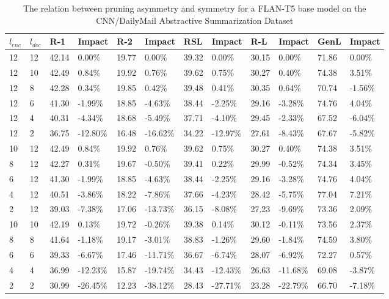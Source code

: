 \begin{table*}[!ht]
    \centering
    \caption{The relation between pruning asymmetry and symmetry for a FLAN-T5 base model on the CNN/DailyMail Abstractive Summarization Dataset}
    \small
    \begin{tabular}{|l|l|l|l|l|l|l|l|l|l|l|l|}
    \hline
        $l_{enc}$ & $l_{dec}$ & R-1 & Impact & R-2 & Impact & RSL & Impact & R-L & Impact & GenL & Impact \\ \hline
        12 & 12 & 42.14 & 0.00\% & 19.77 & 0.00\% & 39.32 & 0.00\% & 30.15 & 0.00\% & 71.86 & 0.00\% \\ \hline
        12 & 10 & 42.49 & 0.84\% & 19.92 & 0.76\% & 39.62 & 0.75\% & 30.27 & 0.40\% & 74.38 & 3.51\% \\ \hline
        12 & 8 & 42.28 & 0.34\% & 19.85 & 0.42\% & 39.48 & 0.41\% & 30.35 & 0.64\% & 70.74 & -1.56\% \\ \hline
        12 & 6 & 41.30 & -1.99\% & 18.85 & -4.63\% & 38.44 & -2.25\% & 29.16 & -3.28\% & 74.76 & 4.04\% \\ \hline
        12 & 4 & 40.31 & -4.34\% & 18.68 & -5.49\% & 37.71 & -4.10\% & 29.45 & -2.33\% & 67.52 & -6.04\% \\ \hline
        12 & 2 & 36.75 & -12.80\% & 16.48 & -16.62\% & 34.22 & -12.97\% & 27.61 & -8.43\% & 67.67 & -5.82\% \\ \hline
        10 & 12 & 42.49 & 0.84\% & 19.92 & 0.76\% & 39.62 & 0.75\% & 30.27 & 0.40\% & 74.38 & 3.51\% \\ \hline
        8 & 12 & 42.27 & 0.31\% & 19.67 & -0.50\% & 39.41 & 0.22\% & 29.99 & -0.52\% & 74.34 & 3.45\% \\ \hline
        6 & 12 & 41.30 & -1.99\% & 18.85 & -4.63\% & 38.44 & -2.25\% & 29.16 & -3.28\% & 74.76 & 4.04\% \\ \hline
        4 & 12 & 40.51 & -3.86\% & 18.22 & -7.86\% & 37.66 & -4.23\% & 28.42 & -5.75\% & 77.04 & 7.21\% \\ \hline
        2 & 12 & 39.03 & -7.38\% & 17.06 & -13.73\% & 36.15 & -8.08\% & 27.23 & -9.69\% & 73.36 & 2.09\% \\ \hline
        10 & 10 & 42.19 & 0.13\% & 19.72 & -0.26\% & 39.38 & 0.14\% & 30.12 & -0.11\% & 73.56 & 2.37\% \\ \hline
        8 & 8 & 41.64 & -1.18\% & 19.17 & -3.01\% & 38.83 & -1.26\% & 29.60 & -1.84\% & 74.59 & 3.80\% \\ \hline
        6 & 6 & 39.33 & -6.67\% & 17.46 & -11.71\% & 36.67 & -6.74\% & 28.07 & -6.92\% & 72.27 & 0.57\% \\ \hline
        4 & 4 & 36.99 & -12.23\% & 15.87 & -19.74\% & 34.43 & -12.43\% & 26.63 & -11.68\% & 69.08 & -3.87\% \\ \hline
        2 & 2 & 30.99 & -26.45\% & 12.23 & -38.12\% & 28.43 & -27.71\% & 23.28 & -22.79\% & 66.70 & -7.18\% \\ \hline
    \end{tabular}
    \label{tab:asym-base-cnndm}
\end{table*}
